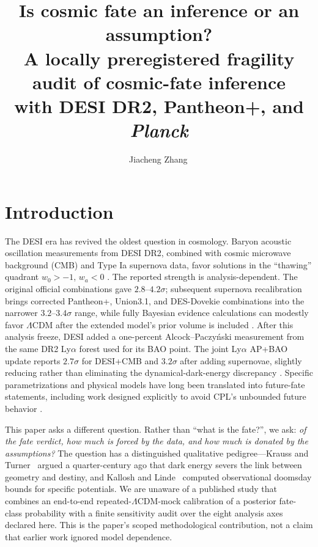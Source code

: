 \documentclass[a4paper,11pt]{article}
\title{\boldmath Is cosmic fate an inference or an assumption?\texorpdfstring{\\}{: }
A locally preregistered fragility audit of cosmic-fate inference\texorpdfstring{\\}{ }
with DESI DR2, Pantheon+, and \textit{Planck}}
\author[a]{Jiacheng Zhang\,\orcidlink{0009-0007-7438-320X}}
\affiliation[a]{Independent researcher}
\newcommand{\lcdm}{\ensuremath{\Lambda\mathrm{CDM}}}
\newcommand{\wz}{\ensuremath{w_0}}
\newcommand{\wa}{\ensuremath{w_a}}
\begin{document}
\maketitle
\flushbottom

\section{Introduction}\label{sec:intro}

The DESI era has revived the oldest question in cosmology. Baryon acoustic
oscillation measurements from DESI DR2, combined with cosmic microwave
background (CMB) and Type Ia supernova data, favor solutions in the
``thawing'' quadrant $\wz>-1$, $\wa<0$ \cite{DESIDR2}. The reported strength
is analysis-dependent. The original official combinations gave
$2.8$--$4.2\sigma$; subsequent supernova recalibration brings corrected
Pantheon+, Union3.1, and DES-Dovekie combinations into the narrower
$3.2$--$3.4\sigma$ range, while fully Bayesian evidence calculations can
modestly favor \lcdm{} after the extended model's prior volume is included
\cite{DESIDR2,Dovekie2025,Union31,BayesianDESIDR2,
CompressedEvidence2025,Efstathiou2024,HuangCaiWang2025,WangMota2025}.
After this analysis freeze, DESI added a one-percent Alcock--Paczy\'nski
measurement from the same DR2 Ly$\alpha$ forest used for its BAO point. The
joint Ly$\alpha$ AP+BAO update reports $2.7\sigma$ for DESI+CMB and
$3.2\sigma$ after adding supernovae, slightly reducing rather than eliminating
the dynamical-dark-energy discrepancy \cite{DESIDR2ResultsIV}.
Specific parametrizations and physical models have long been translated into
future-fate statements, including work designed explicitly to avoid CPL's
unbounded future behavior
\cite{LiFate2012,AndreiIjjasSteinhardt2022,Gialamas2025}.

This paper asks a different question. Rather than ``what is the fate?'', we
ask: \emph{of the fate verdict, how much is forced by the data, and how much
is donated by the assumptions?} The question has a distinguished qualitative
pedigree---Krauss and Turner~\cite{KraussTurner1999} argued a quarter-century ago that dark
energy severs the link between geometry and destiny, and
Kallosh and Linde~\cite{KalloshLinde2003} computed observational doomsday bounds for specific
potentials. We are unaware of a published study that combines an end-to-end
repeated-\lcdm{}-mock calibration of a posterior fate-class probability with a
finite sensitivity audit over the eight analysis axes declared here. This is
the paper's scoped methodological contribution, not a claim that earlier work
ignored model dependence.
\end{document}
